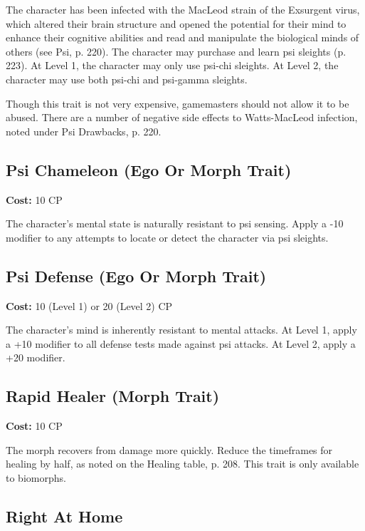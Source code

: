 The character has been infected with the MacLeod strain of the Exsurgent virus, which altered their brain structure and opened the potential for their mind to enhance their cognitive abilities and read and manipulate the biological minds of others (see Psi, p. 220). The character may purchase and learn psi sleights (p. 223). At Level 1, the character may only use psi-chi sleights. At Level 2, the character may use both psi-chi and psi-gamma sleights.

Though this trait is not very expensive, gamemasters should not allow it to be abused. There are a number of negative side effects to Watts-MacLeod infection, noted under Psi Drawbacks, p. 220.

\subsection{Psi Chameleon (Ego Or Morph Trait)}
\label{sec:traits-psi-chameleon}

\textbf{Cost:} 10 CP

The character’s mental state is naturally resistant to psi sensing. Apply a -10 modifier to any attempts to locate or detect the character via psi sleights.

\subsection{Psi Defense (Ego Or Morph Trait)}
\label{sec:traits-psi-defense}

\textbf{Cost:} 10 (Level 1) or 20 (Level 2) CP

The character’s mind is inherently resistant to mental attacks. At Level 1, apply a +10 modifier to all defense tests made against psi attacks. At Level 2, apply a +20 modifier.

\subsection{Rapid Healer (Morph Trait)}
\label{sec:traits-rapid-healer}

\textbf{Cost:} 10 CP

The morph recovers from damage more quickly. Reduce the timeframes for healing by half, as noted on the Healing table, p. 208. This trait is only available to biomorphs.

\subsection{Right At Home}
\label{sec:traits-right-at-home}

